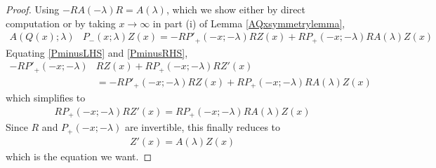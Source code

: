 \documentclass[thesis.tex]{subfiles}
\begin{document}
\begin{lemma}
\begin{proof}
Using $-R A(-\lambda) R = A(\lambda)$, which we show either by direct computation or by taking $x \rightarrow \infty$ in part (i) of Lemma \ref{AQxsymmetrylemma},
\begin{align}\label{PminusRHS}
A(Q(x); \lambda)&P_-(x; \lambda) Z(x) =  -R P'_+(-x; -\lambda) R Z(x) + R P_+(-x; -\lambda) R A(\lambda) Z(x)
\end{align}
Equating \cref{PminusLHS} and \cref{PminusRHS},
\begin{align*}
-RP'_+(-x; -\lambda)&R Z(x) + RP_+(-x; -\lambda)R Z'(x) \\
&= -R P'_+(-x; -\lambda) R Z(x) + R P_+(-x; -\lambda) R A(\lambda) Z(x)
\end{align*}
which simplifies to
\begin{align*}
RP_+(-x; -\lambda)R Z'(x) = R P_+(-x; -\lambda) R A(\lambda) Z(x)
\end{align*}
Since $R$ and $P_+(-x; -\lambda)$ are invertible, this finally reduces to 
\begin{align*}
Z'(x) = A(\lambda) Z(x)
\end{align*}
which is the equation we want.
\end{proof}
\end{lemma}
\end{document}
